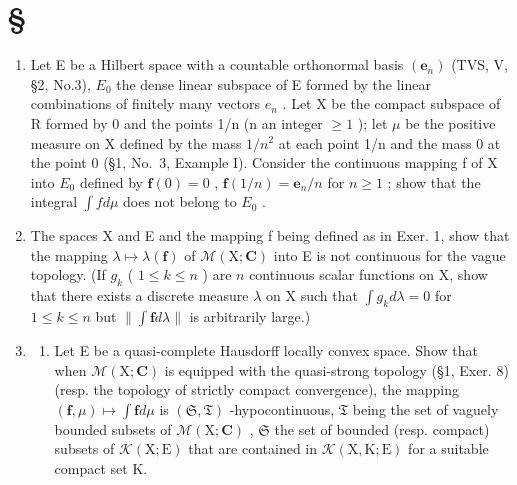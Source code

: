 \section*{\texorpdfstring{\S\CurrentExerciseGroup}{Section \CurrentExerciseGroup}}
{}

\begin{enumerate}
\def\labelenumi{\arabic{enumi})}
\item
  Let E be a Hilbert space with a countable orthonormal basis \((\mathbf{e}_{n})\) (TVS, V, §2, No.3), \(E_{0}\) the dense linear subspace of E formed by the linear combinations of finitely many vectors \(e_{n}\) . Let X be the compact subspace of R formed by 0 and the points 1/n (n an integer \(\geqslant 1\) ); let \(\mu\) be the positive measure on X defined by the mass \(1/n^{2}\) at each point 1/n and the mass 0 at the point 0 (§1, No.~3, Example I). Consider the continuous mapping f of X into \(E_{0}\) defined by \(\mathbf{f}(0)=0\) , \(\mathbf{f}(1/n)=\mathbf{e}_{n}/n\) for \(n\geqslant1\) ; show that the integral \(\int f d\mu\) does not belong to \(E_{0}\) .
\item
  The spaces X and E and the mapping f being defined as in Exer. 1, show that the mapping \(\lambda \mapsto \lambda(\mathbf{f})\) of \(\mathcal{M}(\mathrm{X};\mathbf{C})\) into E is not continuous for the vague topology. (If \(g_{k}\) ( \(1 \leqslant k \leqslant n\) ) are \(n\) continuous scalar functions on X, show that there exists a discrete measure \(\lambda\) on X such that \(\int g_{k} d\lambda = 0\) for \(1 \leqslant k \leqslant n\) but \(\| \int \mathbf{f} d\lambda \|\) is arbitrarily large.)
\item
  \begin{enumerate}
  \def\labelenumii{\alph{enumii})}
  \tightlist
  \item
    Let E be a quasi-complete Hausdorff locally convex space. Show that when \(\mathcal{M}(\mathrm{X};\mathbf{C})\) is equipped with the quasi-strong topology (§1, Exer. 8) (resp. the topology of strictly compact convergence), the mapping \((\mathbf{f},\mu)\mapsto\int\mathbf{f}d\mu\) is \((\mathfrak{S},\mathfrak{T})\) -hypocontinuous, \(\mathfrak{T}\) being the set of vaguely bounded subsets of \(\mathcal{M}(\mathrm{X};\mathbf{C})\) , \(\mathfrak{S}\) the set of bounded (resp. compact) subsets of \(\mathcal{K}(\mathrm{X};\mathrm{E})\) that are contained in \(\mathcal{K}(\mathrm{X},\mathrm{K};\mathrm{E})\) for a suitable compact set K.
  \end{enumerate}
\end{enumerate}

